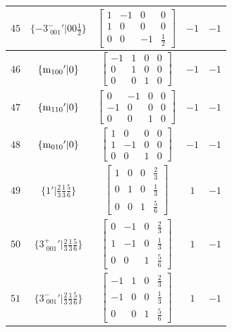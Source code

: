 \documentclass[fleqn,8pt]{jsarticle}
\begin{document}
\begin{longtable}{ccccc}
$ 45 $ & $ \{-3^{-}_{\,\,001}{}'|0 0 \frac{1}{2}\} $ & $ \begin{bmatrix} 1 & -1 & 0 & 0 \\ 1 & 0 & 0 & 0 \\ 0 & 0 & -1 & \frac{1}{2} \end{bmatrix} $ & $ -1 $ & $ -1 $ \\ \hline
$ 46 $ & $ \{{\rm m}_{100}{}'|0\} $ & $ \begin{bmatrix} -1 & 1 & 0 & 0 \\ 0 & 1 & 0 & 0 \\ 0 & 0 & 1 & 0 \end{bmatrix} $ & $ -1 $ & $ -1 $ \\ \hline
$ 47 $ & $ \{{\rm m}_{110}{}'|0\} $ & $ \begin{bmatrix} 0 & -1 & 0 & 0 \\ -1 & 0 & 0 & 0 \\ 0 & 0 & 1 & 0 \end{bmatrix} $ & $ -1 $ & $ -1 $ \\ \hline
$ 48 $ & $ \{{\rm m}_{010}{}'|0\} $ & $ \begin{bmatrix} 1 & 0 & 0 & 0 \\ 1 & -1 & 0 & 0 \\ 0 & 0 & 1 & 0 \end{bmatrix} $ & $ -1 $ & $ -1 $ \\ \hline
$ 49 $ & $ \{1{}'|\frac{2}{3} \frac{1}{3} \frac{5}{6}\} $ & $ \begin{bmatrix} 1 & 0 & 0 & \frac{2}{3} \\ 0 & 1 & 0 & \frac{1}{3} \\ 0 & 0 & 1 & \frac{5}{6} \end{bmatrix} $ & $ 1 $ & $ -1 $ \\ \hline
$ 50 $ & $ \{3^{+}_{\,\,001}{}'|\frac{2}{3} \frac{1}{3} \frac{5}{6}\} $ & $ \begin{bmatrix} 0 & -1 & 0 & \frac{2}{3} \\ 1 & -1 & 0 & \frac{1}{3} \\ 0 & 0 & 1 & \frac{5}{6} \end{bmatrix} $ & $ 1 $ & $ -1 $ \\ \hline
$ 51 $ & $ \{3^{-}_{\,\,001}{}'|\frac{2}{3} \frac{1}{3} \frac{5}{6}\} $ & $ \begin{bmatrix} -1 & 1 & 0 & \frac{2}{3} \\ -1 & 0 & 0 & \frac{1}{3} \\ 0 & 0 & 1 & \frac{5}{6} \end{bmatrix} $ & $ 1 $ & $ -1 $ \\ \hline

\end{longtable}
\end{document}
